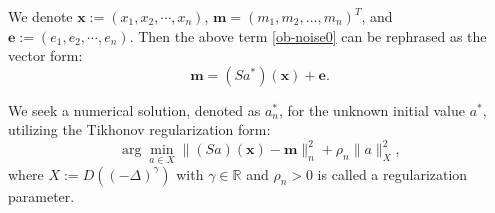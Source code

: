 \documentclass[11pt]{article}
\numberwithin{equation}{section}
\begin{document}
We denote $\mathbf{x}:=(x_1,x_2,\cdots,x_n)$, $\mathbf{m} = (m_1, m_2, ..., m_n)^T$, and $\mathbf{e}:=(e_1,e_2,\cdots,e_n)$. Then the above term \eqref{ob-noise0} can be rephrased as the vector form:
\begin{equation}\label{ob-noise}
\mathbf{m} = (Sa^*)(\mathbf{x}) + \mathbf{e}.
\end{equation}

We seek a numerical solution, denoted as $ a_n^*$, for the unknown initial value $a^*$, utilizing the Tikhonov regularization form:
\begin{equation}\label{Tik-vec}
\arg\min_{a \in X} \| (Sa)(\mathbf{x}) - \mathbf{m}\|_n^2 + \rho_n \| a \|^2_{X},
\end{equation}
where $X:=D((-\Delta)^\gamma)$ with $\gamma\in \mathbb R$ and $ \rho_n > 0 $ is called a regularization parameter.
\end{document}
